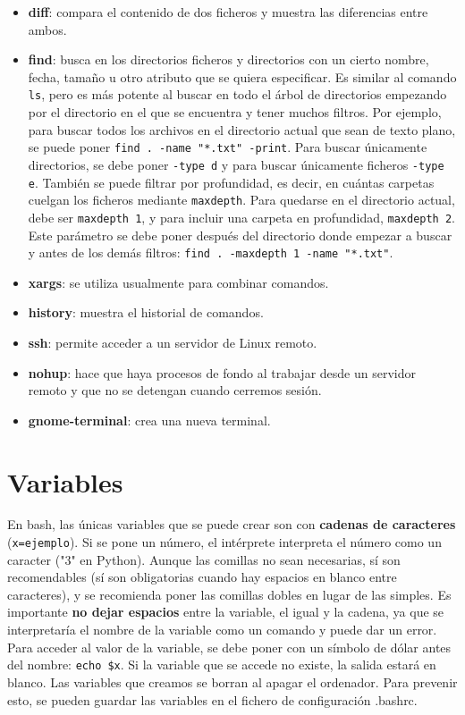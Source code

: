 \begin{itemize}
\item \textbf{diff}: compara el contenido de dos ficheros y muestra las diferencias entre ambos.

\item \textbf{find}: busca en los directorios ficheros y directorios con un cierto nombre, fecha, tamaño u otro atributo que se quiera especificar. Es similar al comando \texttt{ls}, pero es más potente al buscar en todo el árbol de directorios empezando por el directorio en el que se encuentra y tener muchos filtros. Por ejemplo, para buscar todos los archivos en el directorio actual que sean de texto plano, se puede poner \texttt{find . -name "*.txt" -print}. Para buscar únicamente directorios, se debe poner \texttt{-type d} y para buscar únicamente ficheros \texttt{-type e}. También se puede filtrar por profundidad, es decir, en cuántas carpetas cuelgan los ficheros mediante \texttt{maxdepth}. Para quedarse en el directorio actual, debe ser \texttt{maxdepth 1}, y para incluir una carpeta en profundidad, \texttt{maxdepth 2}. Este parámetro se debe poner después del directorio donde empezar a buscar y antes de los demás filtros: \texttt{find . -maxdepth 1 -name "*.txt"}. 

\item \textbf{xargs}: se utiliza usualmente para combinar comandos.

\item \textbf{history}: muestra el historial de comandos.

\item \textbf{ssh}: permite acceder a un servidor de Linux remoto.

\item \textbf{nohup}: hace que haya procesos de fondo al trabajar desde un servidor remoto y que no se detengan cuando cerremos sesión.

\item \textbf{gnome-terminal}: crea una nueva terminal.
\end{itemize}

\section{Variables}
En bash, las únicas variables que se puede crear son con \textbf{cadenas de caracteres} (\texttt{x=ejemplo}). Si se pone un número, el intérprete interpreta el número como un caracter ("3" en Python). Aunque las comillas no sean necesarias, sí son recomendables (sí son obligatorias cuando hay espacios en blanco entre caracteres), y se recomienda poner las comillas dobles en lugar de las simples. Es importante \textbf{no dejar espacios} entre la variable, el igual y la cadena, ya que se interpretaría el nombre de la variable como un comando y puede dar un error. Para acceder al valor de la variable, se debe poner con un símbolo de dólar antes del nombre: \texttt{echo \$x}. Si la variable que se accede no existe, la salida estará en blanco. Las variables que creamos se borran al apagar el ordenador. Para prevenir esto, se pueden guardar las variables en el fichero de configuración .bashrc.

